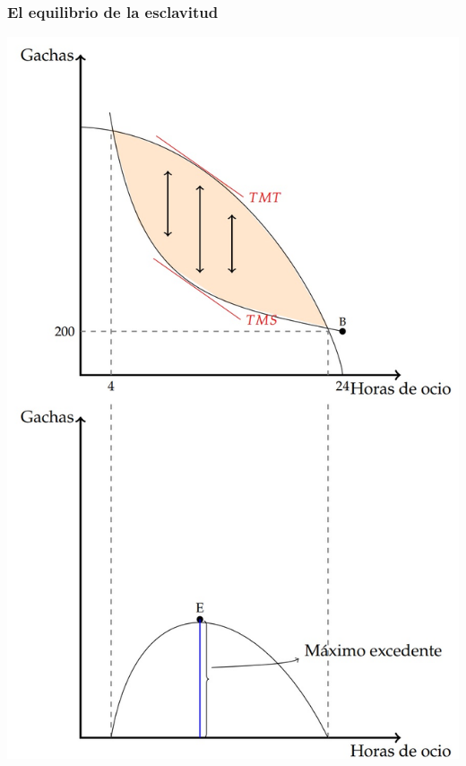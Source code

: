 \documentclass{beamer}
\begin{document}
\begin{frame}
\frametitle{El equilibrio de la esclavitud}
\centering
\centering
\includegraphics[scale=0.55]{../Figures/Instituciones1.jpg}
\end{frame}

\end{document}
